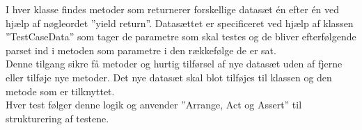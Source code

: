 I hver klasse findes metoder som returnerer forskellige datasæt én efter én ved hjælp af nøgleordet 
”yield return”. Datasættet er specificeret ved hjælp af klassen ”TestCaseData” som tager de parametre 
som skal testes og de bliver efterfølgende parset ind i metoden som parametre i den rækkefølge de er sat.\\

Denne tilgang sikre få metoder og hurtig tilførsel af nye datasæt uden af fjerne eller tilføje nye metoder. 
Det nye datasæt skal blot tilføjes til klassen og den metode som er tilknyttet.\\

Hver test følger denne logik og anvender ”Arrange, Act og Assert” til strukturering af testene. 




